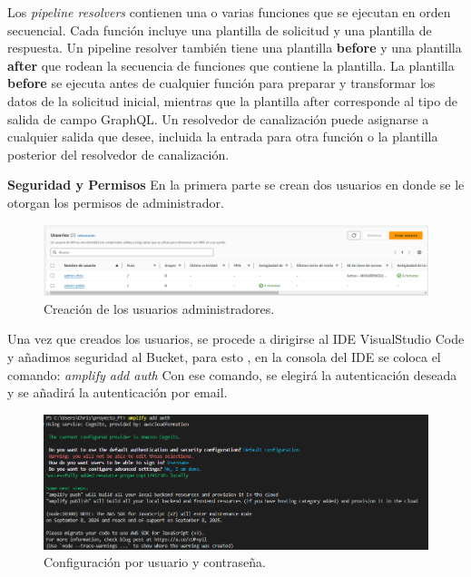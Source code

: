 \noindent Los \textit{pipeline resolvers} contienen una o varias funciones que se ejecutan en orden secuencial. Cada función incluye una plantilla de solicitud y una plantilla de respuesta. Un pipeline resolver también tiene una plantilla \textbf{before} y una plantilla \textbf{after} que rodean la secuencia de funciones que contiene la plantilla. La plantilla \textbf{before} se ejecuta antes de cualquier función para preparar y transformar los datos de la solicitud inicial, mientras que la plantilla after corresponde al tipo de salida de campo GraphQL. Un resolvedor de canalización puede asignarse a cualquier salida que desee, incluida la entrada para otra función o la plantilla posterior del resolvedor de canalización\cite{apacheVTL}.

\noindent \textbf{\large Seguridad y Permisos} \newline
En la primera parte se crean dos usuarios en donde se le otorgan los permisos de administrador.

\begin{figure}[H]
	\centering
	\includegraphics[width=1\linewidth]{imagenes/seguridad_permisos}
	\caption{Creación de los usuarios administradores.}
	\label{fig:seguridadpermisos}
\end{figure}

\noindent Una vez que creados los usuarios, se procede a dirigirse al IDE VisualStudio Code y añadimos seguridad al Bucket, para esto , en la consola del IDE  se coloca el comando: \textit{amplify add auth}
\newline
Con ese comando, se elegirá la autenticación deseada y se añadirá la autenticación por email.
\begin{figure}[H]
	\centering
	\includegraphics{imagenes/add_auth}
	\caption{Configuración por usuario y contraseña.}
	\label{fig:addauth}
\end{figure}

